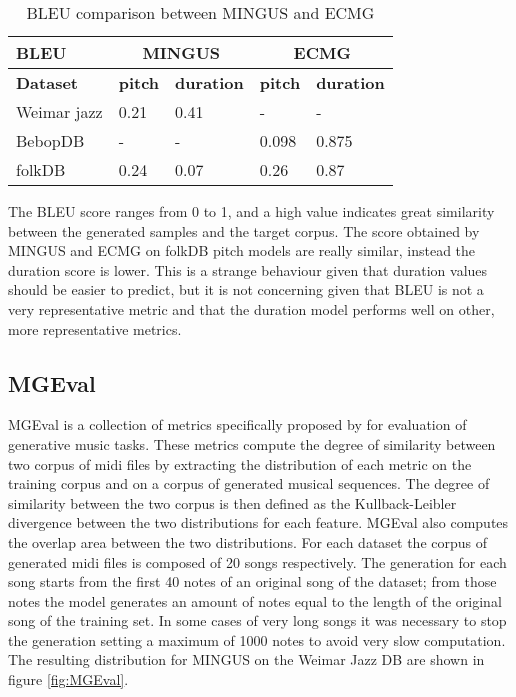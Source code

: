 \documentclass{article}
\begin{document}
\begin{table}[htbp]
	\caption{BLEU comparison between MINGUS and ECMG}
	\begin{center}
		\begin{tabular}{ p{2cm} p{2cm} p{2cm} p{2cm} p{2cm}  }
             \hline
             BLEU &  
             \multicolumn{2}{c}{\textbf{MINGUS}} & 
             \multicolumn{2}{c}{\textbf{ECMG}} \\
             \hline
             \textbf{Dataset} &  
             \textbf{pitch} & 
             \textbf{duration} &
             \textbf{pitch} & 
             \textbf{duration} \\
             \hline
             \hline
             Weimar jazz & 0.21 & 0.41 & - & - \\
             BebopDB & - & - & 0.098 & 0.875 \\
             folkDB & 0.24 & 0.07 & 0.26 & 0.87 \\
             \hline
    \end{tabular}
	\label{tab:BLEU}
	\end{center}
\end{table}

The BLEU score ranges from 0 to 1, and a high value indicates great similarity between the generated samples and the target corpus. The score obtained by MINGUS and ECMG on folkDB pitch models are really similar, instead the duration score is lower. This is a strange behaviour given that duration values should be easier to predict, but it is not concerning given that BLEU is not a very representative metric and that the duration model performs well on other, more representative metrics.

\subsection{MGEval}
MGEval is a collection of metrics specifically proposed by \cite{MGEval} for evaluation of generative music tasks. These metrics compute the degree of similarity between two corpus of midi files by extracting the distribution of each metric on the training corpus and on a corpus of generated musical sequences. The degree of similarity between the two corpus is then defined as the Kullback-Leibler divergence between the two distributions for each feature. MGEval also computes the overlap area between the two distributions. 
For each dataset the corpus of generated midi files is composed of 20 songs respectively. The generation for each song starts from the first 40 notes of an original song of the dataset; from those notes the model generates an amount of notes equal to the length of the original song of the training set. In some cases of very long songs it was necessary to stop the generation setting a maximum of 1000 notes to avoid very slow computation. The resulting distribution for MINGUS on the Weimar Jazz DB are shown in figure \ref{fig:MGEval}.
\end{document}
